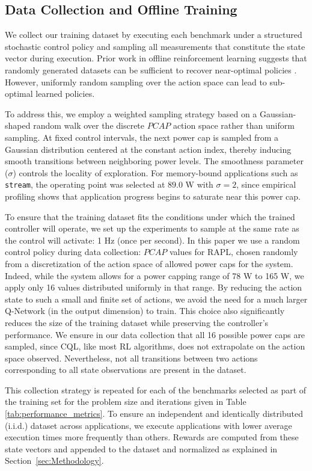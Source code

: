 \subsection{Data Collection and Offline Training}


We collect our training dataset by executing each benchmark under a structured stochastic control policy and sampling all measurements that constitute the state vector during execution. Prior work in offline reinforcement learning suggests that randomly generated datasets can be sufficient to recover near-optimal policies \cite{levine2020offline}. However, uniformly random sampling over the action space can lead to sub-optimal learned policies.

To address this, we employ a weighted sampling strategy based on a Gaussian-shaped random walk over the discrete $PCAP$ action space rather than uniform sampling. At fixed control intervals, the next power cap is sampled from a Gaussian distribution centered at the constant action index, thereby inducing smooth transitions between neighboring power levels. The smoothness parameter ($\sigma$) controls the locality of exploration. For memory-bound applications such as \texttt{stream}, the operating point was selected at $89.0$ W with $\sigma = 2$, since empirical profiling shows that application progress begins to saturate near this power cap. 

To ensure that the training dataset fits the conditions under which the trained controller will operate, we set up the experiments  to sample at the same rate as the control will activate: 1 Hz (once per second). In this paper we use a random control policy during data collection: $PCAP$ values for RAPL, chosen randomly from a discretization of the action space of allowed power caps for the system. Indeed, while the system allows for a power capping range of 78 \unit{\watt} to 165 \unit{\watt}, we apply only 16 values distributed uniformly in that range. By reducing the action state to such a small and finite set of actions, we avoid the need for a much larger Q-Network (in the output dimension)
to train. This choice also significantly reduces the size of the  training dataset while preserving the controller’s performance. We ensure in our data collection that all 16 possible power caps are sampled, since CQL, like most RL algorithms, does not extrapolate on the action space observed. Nevertheless, not all transitions between two actions corresponding to all state observations are present in the dataset. 

This collection strategy is repeated for each of the benchmarks selected as part of the training set for the problem size and iterations given in  Table \ref{tab:performance_metrics}. To ensure an independent and identically distributed (i.i.d.) dataset across applications, we execute applications with lower average execution times more frequently than others. Rewards are computed from these state vectors and appended to the dataset and normalized as explained in Section~\ref{sec:Methodology}.

